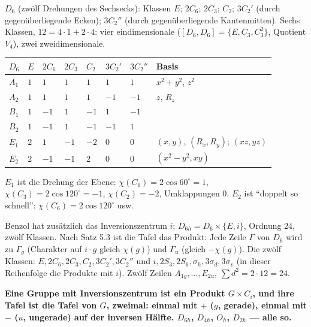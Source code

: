 \begin{merksatz}
$D_6$ (zwölf Drehungen des Sechsecks): Klassen $E$; $2C_6$; $2C_3$; $C_2$; $3C_2'$ (durch gegenüberliegende Ecken); $3C_2''$ (durch gegenüberliegende Kantenmitten). Sechs Klassen, $12 = 4\cdot1 + 2\cdot4$: vier eindimensionale ($[D_6, D_6] = \{E, C_3, C_3^{2}\}$, Quotient $V_4$), zwei zweidimensionale.

\begin{center}
{\small
\renewcommand{\arraystretch}{1.46}
\begin{tabular}{@{}P{1.0cm}P{0.6cm}P{0.8cm}P{0.8cm}P{0.7cm}P{0.8cm}P{0.8cm}P{2.6cm}@{}}
\toprule
$D_6$ & $E$ & $2C_6$ & $2C_3$ & $C_2$ & $3C_2'$ & $3C_2''$ & \textbf{Basis}\\
\midrule
$A_1$ & $1$ & $1$ & $1$ & $1$ & $1$ & $1$ & $x^{2} + y^{2}$, $z^{2}$\\
$A_2$ & $1$ & $1$ & $1$ & $1$ & $-1$ & $-1$ & $z$, $R_z$\\
$B_1$ & $1$ & $-1$ & $1$ & $-1$ & $1$ & $-1$ & \\
$B_2$ & $1$ & $-1$ & $1$ & $-1$ & $-1$ & $1$ & \\
$E_1$ & $2$ & $1$ & $-1$ & $-2$ & $0$ & $0$ & $(x, y)$, $(R_x, R_y)$; $(xz, yz)$\\
$E_2$ & $2$ & $-1$ & $-1$ & $2$ & $0$ & $0$ & $(x^{2} - y^{2}, xy)$\\
\bottomrule
\end{tabular}}
\end{center}
$E_1$ ist die Drehung der Ebene: $\chi(C_6) = 2\cos60^{\circ} = 1$, $\chi(C_3) = 2\cos120^{\circ} = -1$, $\chi(C_2) = -2$, Umklappungen $0$. $E_2$ ist \enquote{doppelt so schnell}: $\chi(C_6) = 2\cos120^{\circ}$ usw.

Benzol hat zusätzlich das Inversionszentrum $i$; $D_{6h} = D_6\times\{E, i\}$, Ordnung $24$, zwölf Klassen. Nach Satz 5.3 ist die Tafel das Produkt: Jede Zeile $\Gamma$ von $D_6$ wird zu $\Gamma_g$ (Charakter auf $i\cdot g$ gleich $\chi(g)$) und $\Gamma_u$ (gleich $-\chi(g)$). Die zwölf Klassen: $E, 2C_6, 2C_3, C_2, 3C_2', 3C_2''$ und $i, 2S_3, 2S_6, \sigma_h, 3\sigma_d, 3\sigma_v$ (in dieser Reihenfolge die Produkte mit $i$). Zwölf Zeilen $A_{1g}, \dots, E_{2u}$, $\sum d^{2} = 2\cdot12 = 24$. \checkmark

\begin{center}
\begin{minipage}{0.9\textwidth}
\textbf{Eine Gruppe mit Inversionszentrum ist ein Produkt $G\times C_i$, und ihre Tafel ist die Tafel von $G$, zweimal: einmal mit $+$ ($g$, gerade), einmal mit $-$ ($u$, ungerade) auf der inversen Hälfte. $D_{6h}$, $D_{4h}$, $O_h$, $D_{2h}$ --- alle so.}
\end{minipage}
\end{center}
\end{merksatz}

